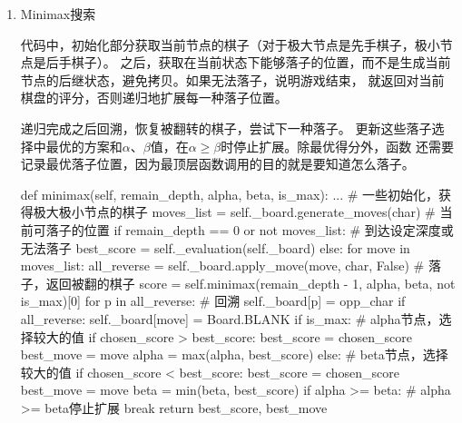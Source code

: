 \documentclass[10pt,letterpaper]{ctexart}
\begin{document}
\begin{enumerate}[itemindent=2.5em,label=\arabic*、]
  \item Minimax搜索
  \par \qquad 代码中，初始化部分获取当前节点的棋子（对于极大节点是先手棋子，极小节点是后手棋子）。
  之后，获取在当前状态下能够落子的位置，而不是生成当前节点的后继状态，避免拷贝。如果无法落子，说明游戏结束，
  就返回对当前棋盘的评分，否则递归地扩展每一种落子位置。
  \par \qquad 递归完成之后回溯，恢复被翻转的棋子，尝试下一种落子。
  更新这些落子选择中最优的方案和$\alpha$、$\beta$值，在$\alpha \geq \beta$时停止扩展。除最优得分外，函数
  还需要记录最优落子位置，因为最顶层函数调用的目的就是要知道怎么落子。
\begin{python}
def minimax(self, remain_depth, alpha, beta, is_max):
  ... # 一些初始化，获得极大极小节点的棋子
  moves_list = self._board.generate_moves(char)   # 当前可落子的位置
  if remain_depth == 0 or not moves_list:   # 到达设定深度或无法落子
      best_score = self._evaluation(self._board)
  else:
    for move in moves_list:
      all_reverse = self._board.apply_move(move, char, False)   # 落子，返回被翻的棋子
      score = self.minimax(remain_depth - 1, alpha, beta, not is_max)[0]
      for p in all_reverse:   # 回溯
          self._board[p] = opp_char
      if all_reverse:
          self._board[move] = Board.BLANK
      if is_max:    # alpha节点，选择较大的值
          if chosen_score > best_score:
              best_score = chosen_score
              best_move = move
          alpha = max(alpha, best_score)
      else:         # beta节点，选择较大的值
          if chosen_score < best_score:
              best_score = chosen_score
              best_move = move
          beta = min(beta, best_score)
      if alpha >= beta:   # alpha >= beta停止扩展
          break
    return best_score, best_move
\end{python}
  

\end{enumerate}
\end{document}
